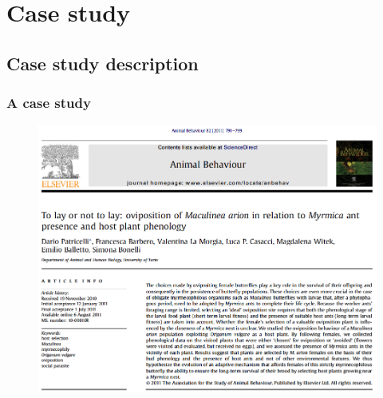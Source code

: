 \documentclass[10pt]{beamer}
\begin{document}

\section{Case study}
\subsection{Case study description}

\begin{frame}
\frametitle{A case study}

\begin{figure}
\includegraphics[width=0.8\linewidth]{pictures/casestudy}
\end{figure}


\end{frame}
\end{document}
